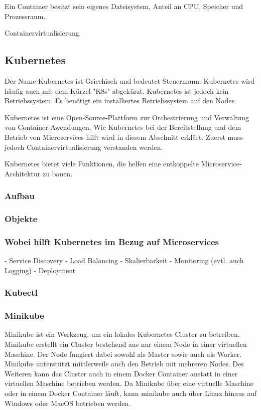 Ein Container besitzt sein eigenes Dateisystem, Anteil an CPU, Speicher und Prozessraum. 

Containervirtualisierung 

\subsection{Kubernetes}

Der Name Kubernetes ist Griechisch und bedeutet Steuermann. Kubernetes wird häufig auch mit dem Kürzel "K8s" abgekürzt. Kubernetes ist jedoch kein Betriebssystem. Es benötigt ein installiertes Betriebssystem auf den Nodes.

Kubernetes ist eine Open-Source-Plattform zur Orchestrierung und Verwaltung von Container-Awendungen. Wie Kubernetes bei der Bereitstellung und dem Betrieb von Microservices hilft wird in diesem Abschnitt erklärt. Zuerst muss jedoch Containervirtualisierung verstanden werden.

Kubernetes bietet viele Funktionen, die helfen eine entkoppelte Microservice-Architektur zu bauen.

\subsubsection{Aufbau}



\subsubsection{Objekte}

\subsubsection{Wobei hilft Kubernetes im Bezug auf Microservices}

- Service Discovery
- Load Balancing
- Skalierbarkeit
- Monitoring (evtl. auch Logging)
- Deployment

\subsubsection{Kubectl}

\subsubsection{Minikube}

Minikube ist ein Werkzeug, um ein lokales Kubernetes Cluster zu betreiben. Minikube erstellt ein Cluster bestehend aus nur einem Node in einer virtuellen Maschine. Der Node fungiert dabei sowohl als Master sowie auch als Worker. Minikube unterstützt mittlerweile auch den Betrieb mit mehreren Nodes. Des Weiteren kann das Cluster auch in einem Docker Container anstatt in einer virtuellen Maschine betrieben werden. Da Minikube über eine virtuelle Maschine oder in einem Docker Container läuft, kann minikube auch über Linux hinaus auf Windows oder MacOS betrieben werden.
